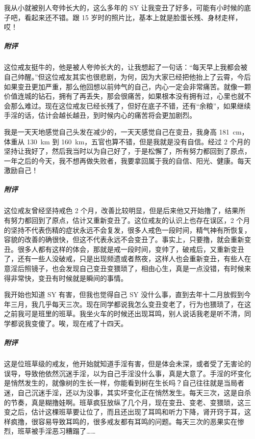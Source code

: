\begin{case}[变丑]
    我从小就被别人夸帅长大的，这么多年的 SY 让我变丑了好多，可能有小时候的底子吧，看起来还不错。跟 15 岁时的照片比，基本上就是脸蛋长残、身材走样，哎！
    \subparagraph{附评} 这位戒友挺牛的，他是被人夸帅长大的，让我想起了一句话：“每天早上我都会被自己帅醒。”但这位戒友其实也很悲剧，为何，因为大家已经把他抬上了云霄，今后如果变丑更加严重，那么他回想以前帅气的自己，内心一定会非常痛苦。就像一颗价值连城的钻石，拥有了再丢失，那会很痛苦，如果根本没有拥有过，心里也就不会那么难过。现在这位戒友已经长残了，但好在底子不错，还有“余粮”，如果继续手淫的话，估计会越长越丑，到时候内心的痛苦将会更加剧烈。
\end{case}

\begin{case}[变丑]
    我是一天天地感觉自己头发在减少的，一天天感觉自己在变丑，我身高 \SI{181}{\centi\metre}，体重从 \SI{130}{\kilo\metre} 到 \SI{160}{\kilo\metre}，五官也算不错，但是我就是没有自信。经过 2 个月的坚持让我好了，然后我当时以为自己好了，于是松懈了，所有努力都回到了原点，一年之后的今天，我不想再做失败者，我要拿回属于我的自信、阳光、健康。每天激励自己！
    \subparagraph{附评} 这位戒友曾经坚持戒色 2 个月，改善比较明显，但是后来他又开始撸了，结果所有努力都回到了原点，估计又重新变丑了。这位戒友的认识上也存在误区，2 个月的坚持不代表伤精的症状永远不会复发，很多人戒色一段时间，精气神有所恢复，容貌的改善的确很快，但这不代表永远不会变丑了。事实上，只要撸，就会重新变丑。很多人都有这样的体会，那就是戒一段时间，变帅了，破戒后，又重新变丑了，还有一些人没破戒，只是出现频遗或者熬夜，这样人也会重新变丑，有些人在意淫后照镜子，也会发现自己变丑变猥琐了，相由心生，真是一点没错，有时候来得非常快，变丑有时候就是瞬间的事情。
\end{case}

\begin{case}[变丑]
    我开始也知道 SY 有害，但我也觉得自己 SY 没什么事，直到去年十二月放假到今年三月，我几乎每天三次。现在同学都说我怎么变丑变老了，行为也猥琐了，在这之前我可是班里的班草。我坐火车的时候还出现耳鸣，别人说话我老是听不清，同学都说我变傻了。唉，现在戒了十四天。
    \subparagraph{附评} 这是位班草级的戒友，他开始就知道手淫有害，但是体会未深，或者受了无害论的误导，导致他依然沉迷手淫，以为自己手淫没什么事，真是大意了。手淫的坏变化是悄然发生的，就像树的生长一样，你能看到树在生长吗？自己往往就是当局者迷，自己沉迷手淫，还以为没事，其实坏变化正在悄然发生。每天三次，这是自杀的节奏，真是糊撸娃啊。班草疯狂放纵了几个月，现在变丑、变老、变猥琐，这三变之后，估计这棵班草要让位了，而且还出现了耳鸣和听力下降，肾开窍于耳，这样疯撸，很容易导致耳鸣的，很多戒友都有耳鸣的问题。每天三次的恶果实在惨烈，班草被手淫恶习糟蹋了……
\end{case}


